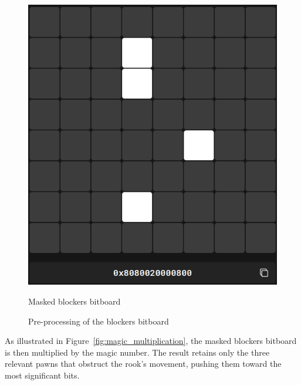 \begin{figure}[H]
\begin{minipage}[c]{0.4\textwidth}
        \includegraphics[width=\textwidth]{Imagenes/magics_processed_blockers.png}
        \caption*{Masked blockers bitboard}
    \end{minipage}
    \caption{Pre-processing of the blockers bitboard}
    \label{fig:magic_preprocessing}
\end{figure}

\noindent As illustrated in Figure~\ref{fig:magic_multiplication}, the masked blockers bitboard is then multiplied by the magic number. The result retains only the three relevant pawns that obstruct the rook's movement, pushing them toward the most significant bits.

